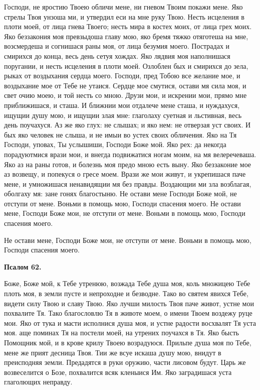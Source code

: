 Господи, не яростию Твоею обличи мене, ни гневом Твоим покажи мене. Яко стрелы Твоя унзоша ми, и утвердил еси на мне руку Твою. Несть исцеления в плоти моей, от лица гнева Твоего; несть мира в костех моих, от лица грех моих. Яко беззакония моя превзыдоша главу мою, яко бремя тяжко отяготеша на мне, возсмердеша и согнишася раны моя, от лица безумия моего. Пострадах и смирихся до конца, весь день сетуя хождах. Яко лядвия моя наполнишася поругании, и несть исцеления в плоти моей. Озлоблен бых и смирихся до зела, рыках от воздыхания сердца моего. Господи, пред Тобою все желание мое, и воздыхание мое от Тебе не утаися. Сердце мое смутися, остави мя сила моя, и свет очию моею, и той несть со мною. Друзи мои, и искрении мои, прямо мне приближишася, и сташа. И ближнии мои отдалече мене сташа, и нуждахуся, ищущии душу мою, и ищущии злая мне: глаголаху суетная и льстивная, весь день поучахуся. Аз же яко глух: не слышах; и яко нем: не отверзая уст своих. И бых яко человек не слыша, и не имыи во устех своих обличения. Яко на Тя Господи, уповах, Ты услышиши, Господи Боже мой. Яко рех: да некогда порадуютмися врази мои, и внегда подвижатися ногам моим, на мя велеречеваша. Яко аз на раны готов, и болезнь моя предо мною есть выну. Яко беззаконие мое аз возвещу, и попекуся о гресе моем. Врази же мои живут, и укрепишася паче мене, и умножишася ненавидящии мя без правды. Воздающии ми зла возблагая, оболгаху мя: зане гонях благостыню. Не остави мене Господи Боже мой, не отступи от мене. Воньми в помощь мою, Господи спасения моего. Не остави мене, Господи Боже мои, не отступи от мене. Воньми в помощь мою, Господи спасения моего.

Не остави мене, Господи Боже мои, не отступи от мене. Воньми в помощь мою, Господи спасения моего.


\medskip


\bfseries Псалом 62.\normalfont{}\nopagebreak


Боже, Боже мой, к Тебе утренюю, возжада Тебе душа моя, коль множицею Тебе плоть моя, в земли пусте и непроходне и безводне. Тако во святем явихся Тебе, видети силу Твою и славу Твою. Яко лучши милость Твоя паче живот, устне мои похвалите Тя. Тако благословлю Тя в животе моем, о имени Твоем воздежу руце мои. Яко от тука и масти исполнися душа моя, и устне радости восхвалят Тя уста моя. аще поминах Тя на постели моей, на утрених поучахся в Тя. Яко бысть Помощник мой, и в крове крилу Твоею возрадуюся. Прильпе душа моя по Тебе, мене же прият десница Твоя. Тии же всуе искаша душу мою, внидут в преисподняя земли. Предадятся в руки оружию, части лисовом будут. Царь же возвеселится о Бозе, похвалится всяк кленыися Им. Яко заградишася уста глаголющих неправду.

